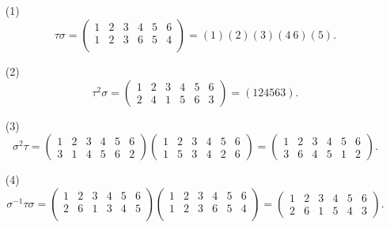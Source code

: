 \documentclass[UTF8]{ctexart}
\begin{document}
\subsection{}   %
\begin{enumerate}
    \item [(1)]
    \[
        \tau \sigma 
        = 
        \begin{pmatrix}
            1 & 2 & 3 & 4 & 5 & 6\\
            1 & 2 & 3 & 6 & 5 & 4\\
        \end{pmatrix}  
        = 
        (1)(2)(3)(4\ 6)(5).
    \]
    \item [(2)]
    \[
        \tau ^2 \sigma 
        = 
        \begin{pmatrix}
            1 & 2 & 3 & 4 & 5 & 6\\
            2 & 4 & 1 & 5 & 6 & 3
        \end{pmatrix}  
        =
        (124563).
    \]
    \item [(3)]
    \[
        \sigma ^2 \tau  
        = 
        \begin{pmatrix}
            1 & 2 & 3 & 4 & 5 & 6\\
            3 & 1 & 4 & 5 & 6 & 2
        \end{pmatrix}
        \begin{pmatrix}
            1 & 2 & 3 & 4 & 5 & 6\\
            1 & 5 & 3 & 4 & 2 & 6
        \end{pmatrix}
        =
        \begin{pmatrix}
            1 & 2 & 3 & 4 & 5 & 6\\
            3 & 6 & 4 & 5 & 1 & 2
        \end{pmatrix}.
    \]
    \item [(4)]
    \[
        \sigma ^{-1} \tau \sigma 
        = 
        \begin{pmatrix}
            1 & 2 & 3 & 4 & 5 & 6\\
            2 & 6 & 1 & 3 & 4 & 5\\
        \end{pmatrix} 
        \begin{pmatrix}
            1 & 2 & 3 & 4 & 5 & 6\\
            1 & 2 & 3 & 6 & 5 & 4\\
        \end{pmatrix}  
        =
        \begin{pmatrix}
            1 & 2 & 3 & 4 & 5 & 6\\
            2 & 6 & 1 & 5 & 4 & 3
        \end{pmatrix}.
    \]
\end{enumerate}
\end{document}
